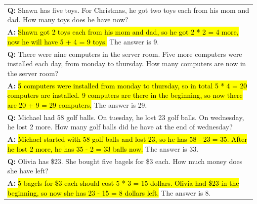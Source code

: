 \begin{table}[H]
\begin{tabular}{p{\linewidth}}
        \vspace{0mm}
        \textbf{Q:} Shawn has five toys. For Christmas, he got two toys each from his mom and dad. How many toys does he have now? \\
        \vspace{-1mm}
        \textbf{A:} \hl{Shawn got 2 toys each from his mom and dad, so he got 2 * 2 = 4 more, now he will have 5 + 4 = 9 toys.} The answer is 9. \\
        \vspace{0mm}
        \textbf{Q:} There were nine computers in the server room. Five more computers were installed each day, from monday to thursday. How many computers are now in the server room? \\
        \vspace{-1mm}
        \textbf{A:} \hl{5 computers were installed from monday to thursday, so in total 5 * 4 = 20 computers are installed. 9 computers are there in the beginning, so now there are 20 + 9 = 29 computers.} The answer is 29. \\
        \vspace{0mm}
        \textbf{Q:} Michael had 58 golf balls. On tuesday, he lost 23 golf balls. On wednesday, he lost 2 more. How many golf balls did he have at the end of wednesday? \\
        \vspace{-1mm}
        \textbf{A:} \hl{Michael started with 58 golf balls and lost 23, so he has 58 - 23 = 35. After he lost 2 more, he has 35 - 2 = 33 balls now.} The answer is 33. \\
        \vspace{0mm}
        \textbf{Q:} Olivia has \$23. She bought five bagels for \$3 each. How much money does she have left? \\
        \vspace{-1mm}
        \textbf{A:} \hl{5 bagels for \$3 each should cost 5 * 3 = 15 dollars. Olivia had \$23 in the beginning, so now she has 23 - 15 = 8 dollars left.} The answer is 8. \\
        \bottomrule
    \end{tabular}
    \label{tab:appendix-mwp-prompts-alt}
\end{table}
\endgroup